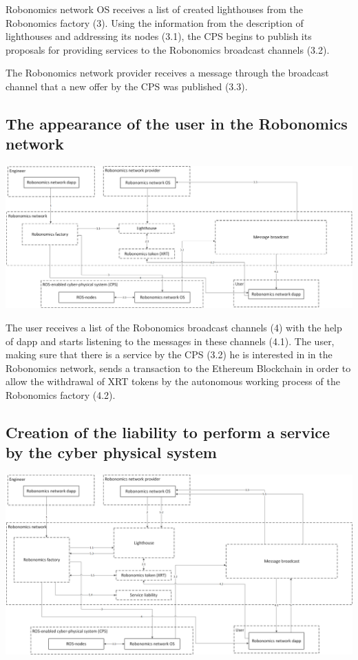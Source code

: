 \documentclass{article}
\begin{document}
Robonomics network OS receives a list of created lighthouses from the Robonomics factory (3). Using the information from the description of lighthouses and addressing its nodes (3.1), the CPS begins to publish its proposals for providing services to the Robonomics broadcast channels (3.2).

The Robonomics network provider receives a message through the broadcast channel that a new offer by the CPS was published (3.3).

\subsection{The appearance of the user in the Robonomics network}

\includegraphics[width=1\textwidth]{step-by-step-4.png} 

The user receives a list of the Robonomics broadcast channels (4) with the help of dapp and starts listening to the messages in these channels (4.1). The user, making sure that there is a service by the CPS (3.2) he is interested in in the Robonomics network, sends a transaction to the Ethereum Blockchain in order to allow the withdrawal of XRT tokens by the autonomous working process of the Robonomics factory (4.2).

\subsection{Creation of the liability to perform a service by the cyber physical system}

\includegraphics[width=1\textwidth]{step-by-step-5.png} 
\end{document}
